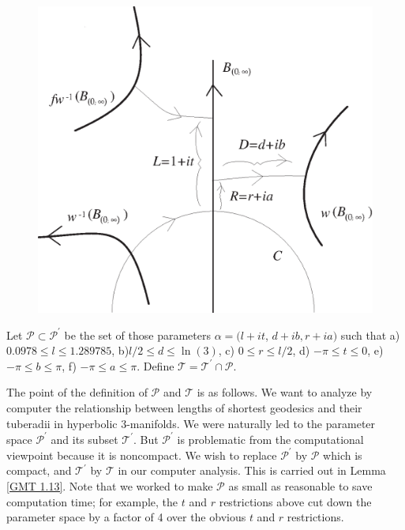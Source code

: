 \begin{figure}[h]\label{GMT fig 1.1}
	\centering
	\includegraphics[scale=0.500]{fig1.1}
\end{figure}

\begin{definition}\label{GMT 1.12}
\hglue-8pt Let ${\mathcal P}\subset{\mathcal P}^{\prime}$ be the set of those parameters $\alpha
= (l+it$, $d+ib, r+ia)$ such
that
 a)       $0.0978\le l \le 1.289785$,
 b)\enspace      $l/2 \le d\le \ln(3)$,
 c) \enspace   $0\le r \le l/2$,
 d) \enspace      $-\pi \le t \le 0$,
 e) \enspace	$-\pi \le b \le \pi$,
 f) \enspace	$-\pi \le a \le \pi$.
\noindent 
Define ${\mathcal T}={\mathcal T}^{\prime}\cap {\mathcal P}.$
\end{definition}

The point of the definition of ${\mathcal P}$ and ${\mathcal T}$ is as follows.  We want to analyze by computer the relationship between lengths of shortest geodesics  and their tuberadii in hyperbolic $3$-manifolds.  We were naturally led to the parameter space 
${\mathcal P}^{\prime}$ and its subset ${\mathcal T}^{\prime}.$  But 
${\mathcal P}^{\prime}$ is problematic from the computational viewpoint because it is noncompact.  We wish to replace 
${\mathcal P}^{\prime}$ by ${\mathcal P}$ which is compact, and 
${\mathcal T}^{\prime}$ by ${\mathcal T}$ in our computer analysis.  This is carried out in Lemma \ref{GMT 1.13}.  Note that we worked to make ${\mathcal P}$ as small as reasonable to save computation time;  for example, the $t$ and $r$ restrictions above cut down the parameter space by a factor of 4 over the obvious $t$ and $r$ restrictions. 

